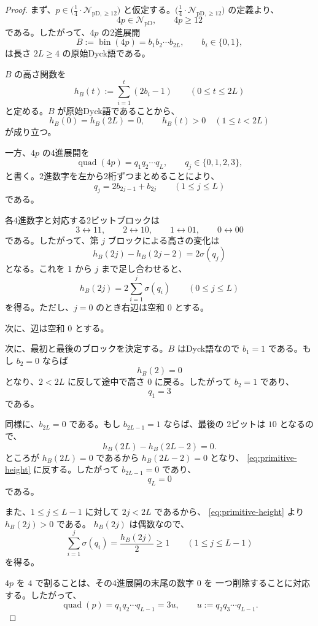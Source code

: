 \documentclass[12pt]{ltjsarticle}
\theoremstyle{plain}
\theoremstyle{definition}
\theoremstyle{plain}
\newcommand{\NpD}{\mathcal{N}_{\mathrm{pD}}}
\newcommand{\Pset}{%
  \bigl(\tfrac{1}{4}\cdot\mathcal{N}_{\mathrm{pD},\geq 12}\bigr)%
}
\begin{document}
\begin{proof}
まず、$p\in\Pset$ と仮定する。$\Pset$ の定義より、
\[
 4p\in\NpD,\qquad 4p\geq12
\]
である。したがって、$4p$ の2進展開
\[
 B:=\operatorname{bin}(4p)
   =b_1b_2\cdots b_{2L},
 \qquad b_i\in\{0,1\},
\]
は長さ $2L\geq4$ の原始Dyck語である。

$B$ の高さ関数を
\[
 h_B(t):=\sum_{i=1}^{t}(2b_i-1)
 \qquad(0\leq t\leq2L)
\]
と定める。$B$ が原始Dyck語であることから、
\begin{equation}\label{eq:primitive-height}
 h_B(0)=h_B(2L)=0,
 \qquad
 h_B(t)>0\quad(1\leq t<2L)
\end{equation}
が成り立つ。

一方、$4p$ の4進展開を
\[
 \operatorname{quad}(4p)=q_1q_2\cdots q_L,
 \qquad q_j\in\{0,1,2,3\},
\]
と書く。2進数字を左から2桁ずつまとめることにより、
\[
 q_j=2b_{2j-1}+b_{2j}
 \qquad(1\leq j\leq L)
\]
である。

各4進数字と対応する2ビットブロックは
\[
 3\longleftrightarrow11,\qquad
 2\longleftrightarrow10,\qquad
 1\longleftrightarrow01,\qquad
 0\longleftrightarrow00
\]
である。したがって、第 $j$ ブロックによる高さの変化は
\[
 h_B(2j)-h_B(2j-2)=2\sigma(q_j)
\]
となる。これを $1$ から $j$ まで足し合わせると、
\begin{equation}\label{eq:height-sigma}
 h_B(2j)
 =2\sum_{i=1}^{j}\sigma(q_i)
 \qquad(0\leq j\leq L)
\end{equation}
を得る。ただし、$j=0$ のとき右辺は空和 $0$ とする。

次に、辺は空和 $0$ とする。

次に、最初と最後のブロックを決定する。$B$ はDyck語なので
$b_1=1$ である。もし $b_2=0$ ならば
\[
 h_B(2)=0
\]
となり、$2<2L$ に反して途中で高さ $0$ に戻る。したがって
$b_2=1$ であり、
\[
 q_1=3
\]
である。

同様に、$b_{2L}=0$ である。もし $b_{2L-1}=1$ ならば、最後の
2ビットは $10$ となるので、
\[
 h_B(2L)-h_B(2L-2)=0.
\]
ところが $h_B(2L)=0$ であるから $h_B(2L-2)=0$ となり、
\eqref{eq:primitive-height} に反する。したがって
$b_{2L-1}=0$ であり、
\[
 q_L=0
\]
である。

また、$1\leq j\leq L-1$ に対して $2j<2L$ であるから、
\eqref{eq:primitive-height} より $h_B(2j)>0$ である。
$h_B(2j)$ は偶数なので、
\begin{equation}\label{eq:prefix-height}
 \sum_{i=1}^{j}\sigma(q_i)
 =\frac{h_B(2j)}{2}
 \geq1
 \qquad(1\leq j\leq L-1)
\end{equation}
を得る。

$4p$ を $4$ で割ることは、その4進展開の末尾の数字 $0$ を
一つ削除することに対応する。したがって、
\[
 \operatorname{quad}(p)=q_1q_2\cdots q_{L-1}=3u,
 \qquad
 u:=q_2q_3\cdots q_{L-1}.
\]


\end{proof}
\end{document}
